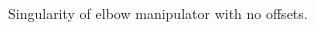 \begin{frame}
\begin{columns}
\begin{column}{0.4\textwidth}
\begin{figure}[bth]
            \end{figure}
            \vspace{-2mm}
            \centering
            \footnotesize{Singularity of elbow manipulator with no offsets.}

            \vspace{3mm}
        \end{column}
    \end{columns}
\end{frame}


\endgroup